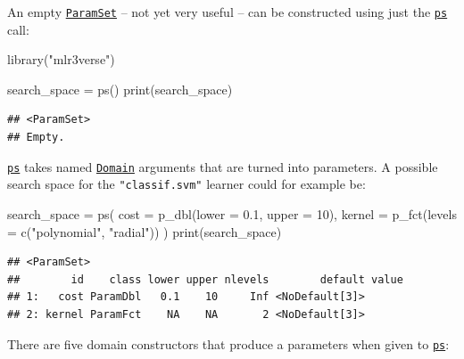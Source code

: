 \documentclass[
]{scrbook}
\newenvironment{Shaded}{\begin{snugshade}}{\end{snugshade}}
\newcommand{\AttributeTok}[1]{\textcolor[rgb]{0.77,0.63,0.00}{#1}}
\newcommand{\DecValTok}[1]{\textcolor[rgb]{0.00,0.00,0.81}{#1}}
\newcommand{\FloatTok}[1]{\textcolor[rgb]{0.00,0.00,0.81}{#1}}
\newcommand{\FunctionTok}[1]{\textcolor[rgb]{0.00,0.00,0.00}{#1}}
\newcommand{\NormalTok}[1]{#1}
\newcommand{\OtherTok}[1]{\textcolor[rgb]{0.56,0.35,0.01}{#1}}
\newcommand{\StringTok}[1]{\textcolor[rgb]{0.31,0.60,0.02}{#1}}
\renewenvironment{Shaded} {\begin{snugshade}\small} {\end{snugshade}}
\begin{document}
An empty \href{https://paradox.mlr-org.com/reference/ParamSet.html}{\texttt{ParamSet}} -- not yet very useful -- can be constructed using just the \href{https://paradox.mlr-org.com/reference/ps.html}{\texttt{ps}} call:

\begin{Shaded}
\begin{Highlighting}[]
\FunctionTok{library}\NormalTok{(}\StringTok{"mlr3verse"}\NormalTok{)}

\NormalTok{search\_space }\OtherTok{=} \FunctionTok{ps}\NormalTok{()}
\FunctionTok{print}\NormalTok{(search\_space)}
\end{Highlighting}
\end{Shaded}

\begin{verbatim}
## <ParamSet>
## Empty.
\end{verbatim}

\href{https://paradox.mlr-org.com/reference/ps.html}{\texttt{ps}} takes named \href{https://paradox.mlr-org.com/reference/Domain.html}{\texttt{Domain}} arguments that are turned into parameters. A possible search space for the \texttt{"classif.svm"} learner could for example be:

\begin{Shaded}
\begin{Highlighting}[]
\NormalTok{search\_space }\OtherTok{=} \FunctionTok{ps}\NormalTok{(}
  \AttributeTok{cost =} \FunctionTok{p\_dbl}\NormalTok{(}\AttributeTok{lower =} \FloatTok{0.1}\NormalTok{, }\AttributeTok{upper =} \DecValTok{10}\NormalTok{),}
  \AttributeTok{kernel =} \FunctionTok{p\_fct}\NormalTok{(}\AttributeTok{levels =} \FunctionTok{c}\NormalTok{(}\StringTok{"polynomial"}\NormalTok{, }\StringTok{"radial"}\NormalTok{))}
\NormalTok{)}
\FunctionTok{print}\NormalTok{(search\_space)}
\end{Highlighting}
\end{Shaded}

\begin{verbatim}
## <ParamSet>
##        id    class lower upper nlevels        default value
## 1:   cost ParamDbl   0.1    10     Inf <NoDefault[3]>      
## 2: kernel ParamFct    NA    NA       2 <NoDefault[3]>
\end{verbatim}

There are five domain constructors that produce a parameters when given to \href{https://paradox.mlr-org.com/reference/ps.html}{\texttt{ps}}:
\end{document}
